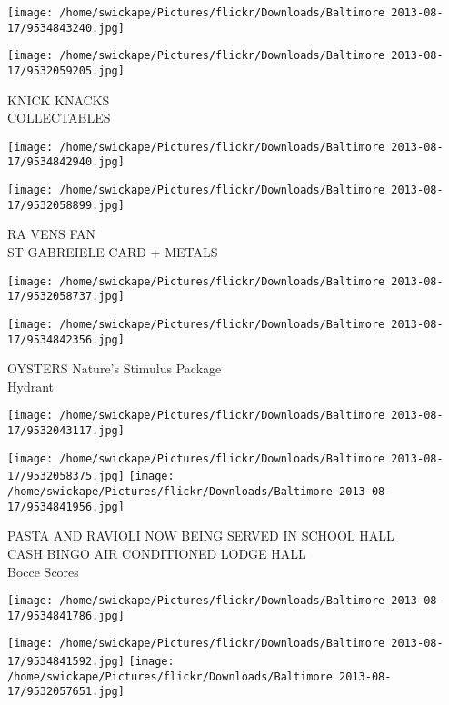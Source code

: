 \documentclass[10pt,letterpaper]{article}
\begin{document}
\texttt{[image: /home/swickape/Pictures/flickr/Downloads/Baltimore 2013-08-17/9534843240.jpg]}

\vspace{0.25in}
\texttt{[image: /home/swickape/Pictures/flickr/Downloads/Baltimore 2013-08-17/9532059205.jpg]}

KNICK KNACKS\\
COLLECTABLES\\
\pagebreak

\texttt{[image: /home/swickape/Pictures/flickr/Downloads/Baltimore 2013-08-17/9534842940.jpg]}

\vspace{0.25in}
\texttt{[image: /home/swickape/Pictures/flickr/Downloads/Baltimore 2013-08-17/9532058899.jpg]}

RA VENS FAN\\
ST GABREIELE CARD + METALS\\
\pagebreak

\texttt{[image: /home/swickape/Pictures/flickr/Downloads/Baltimore 2013-08-17/9532058737.jpg]}

\vspace{0.25in}
\texttt{[image: /home/swickape/Pictures/flickr/Downloads/Baltimore 2013-08-17/9534842356.jpg]}

OYSTERS Nature's Stimulus Package\\
Hydrant\\
\pagebreak

\texttt{[image: /home/swickape/Pictures/flickr/Downloads/Baltimore 2013-08-17/9532043117.jpg]}

\vspace{0.25in}
\texttt{[image: /home/swickape/Pictures/flickr/Downloads/Baltimore 2013-08-17/9532058375.jpg]}
\texttt{[image: /home/swickape/Pictures/flickr/Downloads/Baltimore 2013-08-17/9534841956.jpg]}

PASTA AND RAVIOLI NOW BEING SERVED IN SCHOOL HALL\\
CASH BINGO AIR CONDITIONED LODGE HALL\\
Bocce Scores\\
\pagebreak

\texttt{[image: /home/swickape/Pictures/flickr/Downloads/Baltimore 2013-08-17/9534841786.jpg]}

\vspace{0.25in}
\texttt{[image: /home/swickape/Pictures/flickr/Downloads/Baltimore 2013-08-17/9534841592.jpg]}
\texttt{[image: /home/swickape/Pictures/flickr/Downloads/Baltimore 2013-08-17/9532057651.jpg]}
\end{document}
